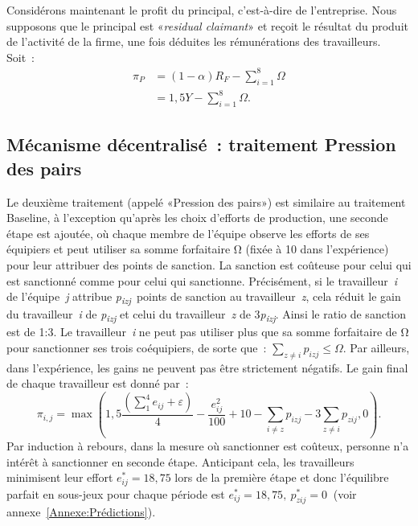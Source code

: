 \begin{Article}
\begin{refsection}[Lebourges]
Considérons maintenant le profit du principal, c'est-à-dire de
l'entreprise. Nous supposons que le principal est «\emph{residual
claimant}» et reçoit le résultat du produit de l'activité de la firme,
une fois déduites les rémunérations des travailleurs. Soit~:
\begin{align}
\pi_{P} &= (1 - \alpha)R_{F} - \sum_{i = 1}^{8}\Omega \nonumber \\
&= 1,5Y - \sum_{i = 1}^{8}\Omega.
\end{align}

\subsection{Mécanisme décentralisé~: traitement Pression des pairs}

Le deuxième traitement (appelé «Pression des pairs») est similaire au
traitement Baseline, à l'exception qu'après les choix d'efforts de
production, une seconde étape est ajoutée, où chaque membre de l'équipe
observe les efforts de ses équipiers et peut utiliser sa somme
forfaitaire Ω (fixée à 10 dans l'expérience) pour leur attribuer des
points de sanction. La sanction est coûteuse pour celui qui est
sanctionné comme pour celui qui sanctionne. Précisément, si le
travailleur~\emph{i} de l'équipe~\emph{j} attribue
\emph{p\textsubscript{izj}}~points de sanction au travailleur~\emph{z},
cela réduit le gain du travailleur~\emph{i} de
\emph{p\textsubscript{izj}} et celui du travailleur~\emph{z} de
3\emph{p\textsubscript{izj}}. Ainsi le ratio de sanction est de 1:3. Le
travailleur~\emph{i} ne peut pas utiliser plus que sa somme forfaitaire
de Ω pour sanctionner ses trois coéquipiers, de sorte que~:
\(\sum_{z \neq i}^{}p_{izj} \leq \Omega\). Par ailleurs, dans
l'expérience, les gains ne peuvent pas être strictement négatifs. Le
gain final de chaque travailleur est donné par~:
\begin{equation}
  \pi_{i,j} = \max\left( 1,5\frac{\left( \sum_{1}^{4}{e_{ij} + \varepsilon} \right)}{4} - \frac{e_{ij}^{2}}{100} + 10 - \sum_{i \neq z}^{}p_{izj} - 3\sum_{z \neq i}^{}p_{zij},0 \right). 
\end{equation}
Par induction à rebours, dans la mesure où sanctionner est coûteux,
personne n'a intérêt à sanctionner en seconde étape. Anticipant cela,
les travailleurs minimisent leur effort $e_{ij}^{*} = 18,75$ lors de
la première étape et donc l'équilibre parfait en sous-jeux pour chaque
période est \(e_{ij}^{*} = 18,75,\ p_{zij}^{*} = 0\ \) (voir annexe~\ref{Annexe:Prédictions}).


\end{refsection}
\end{Article}
